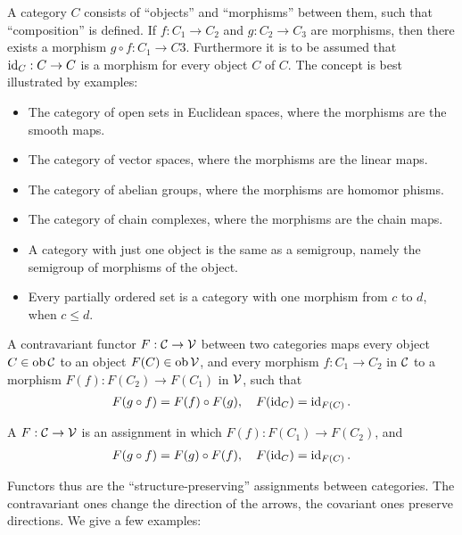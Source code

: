 A category $C$ consists of ``objects'' and ``morphisms'' between them, such that
``composition'' is defined. If $f:C_1\to C_2$ and $g:C_2\to C_3$ are morphisms, then
there exists a morphism $g\circ f: C_1\to C3$. Furthermore it is to be assumed that
$\operatorname{id}_C: C\to C$ is a morphism for every object $C$ of $C$. The concept is best illustrated
by examples:

\begin{itemize}
  \item The category of open sets in Euclidean spaces, where the morphisms are
        the smooth maps.
  \item The category of vector spaces, where the morphisms are the linear maps.
  \item The category of abelian groups, where the morphisms are homomor phisms.
  \item The category of chain complexes, where the morphisms are the chain maps.
  \item A category with just one object is the same as a semigroup, namely the semigroup of morphisms of the object.
  \item Every partially ordered set is a category with one morphism from $c$ to $d$, when $c\le d$.
\end{itemize}

A contravariant functor $F:\mathcal{C}\to \mathcal{V}$ between two categories maps every object
$C\in\operatorname{ob}\mathcal{C}$ to an object $F(C)\in\operatorname{ob}\mathcal{V}$, and every morphism $f:C_1\to C_2$ in $\mathcal{C}$ to
a morphism $F(f):F(C_2)\to F(C_1)$ in $\mathcal{V}$, such that
\begin{align*}
  F(g\circ f)=F(f)\circ F(g),\quad F(\operatorname{id}_C)=\operatorname{id}_{F(C)}.
\end{align*}

A  $F:\mathcal{C}\to\mathcal{V}$ is an assignment in which $F(f):F(C_1)\to F(C_2)$, and
\begin{align*}
  F(g\circ f)=F(g)\circ F(f),\quad F(\operatorname{id}_C)=\operatorname{id}_{F(C)}.
\end{align*}

Functors thus are the ``structure-preserving'' assignments between categories. The
contravariant ones change the direction of the arrows, the covariant ones preserve
directions. We give a few examples:

